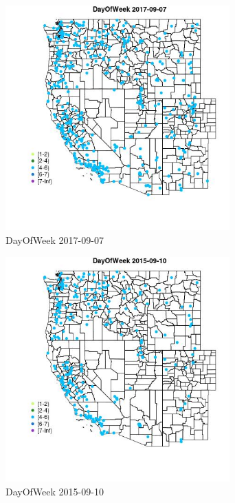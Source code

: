 \begin{figure} 
\centering  
\includegraphics[width=0.77\textwidth]{Code_Outputs/Report_ML_input_PM25_Step4_part_e_de_duplicated_aveswNAs_MapObsDayOfWeek2017-09-07.jpg} 
\caption{\label{fig:Report_ML_input_PM25_Step4_part_e_de_duplicated_aveswNAsMapObsDayOfWeek2017-09-07}DayOfWeek 2017-09-07} 
\end{figure} 
 

\clearpage 

\begin{figure} 
\centering  
\includegraphics[width=0.77\textwidth]{Code_Outputs/Report_ML_input_PM25_Step4_part_e_de_duplicated_aveswNAs_MapObsDayOfWeek2015-09-10.jpg} 
\caption{\label{fig:Report_ML_input_PM25_Step4_part_e_de_duplicated_aveswNAsMapObsDayOfWeek2015-09-10}DayOfWeek 2015-09-10} 
\end{figure} 
 

